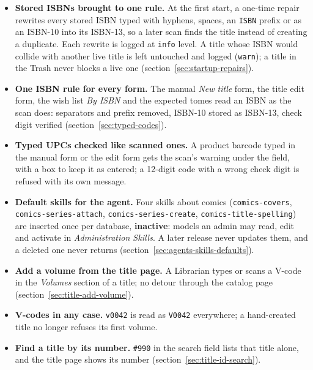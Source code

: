 \begin{itemize}
  \item \textbf{Stored ISBNs brought to one rule.} At the first start, a
        one-time repair rewrites every stored ISBN typed with hyphens,
        spaces, an \texttt{ISBN} prefix or as an ISBN-10 into its
        ISBN-13, so a later scan finds the title instead of creating a
        duplicate. Each rewrite is logged at \texttt{info} level. A
        title whose ISBN would collide with another live title is left
        untouched and logged (\texttt{warn}); a title in the Trash never
        blocks a live one (section~\ref{sec:startup-repairs}).
  \item \textbf{One ISBN rule for every form.} The manual
        \emph{New title} form, the title edit form, the wish list
        \emph{By ISBN} and the expected tomes read an ISBN as the scan
        does: separators and prefix removed, ISBN-10 stored as ISBN-13,
        check digit verified (section~\ref{sec:typed-codes}).
  \item \textbf{Typed UPCs checked like scanned ones.} A product barcode
        typed in the manual form or the edit form gets the scan's
        warning under the field, with a box to keep it as entered; a
        12-digit code with a wrong check digit is refused with its own
        message.
  \item \textbf{Default skills for the agent.} Four skills about comics
        (\texttt{comics-covers}, \texttt{comics-series-attach},
        \texttt{comics-series-create}, \texttt{comics-title-spelling})
        are inserted once per database, \textbf{inactive}: models an
        admin may read, edit and activate in \emph{Administration
        \textrightarrow{} Skills}. A later release never updates them,
        and a deleted one never returns
        (section~\ref{sec:agents-skills-defaults}).
  \item \textbf{Add a volume from the title page.} A Librarian types or
        scans a V-code in the \emph{Volumes} section of a title; no
        detour through the catalog page
        (section~\ref{sec:title-add-volume}).
  \item \textbf{V-codes in any case.} \texttt{v0042} is read as
        \texttt{V0042} everywhere; a hand-created title no longer
        refuses its first volume.
  \item \textbf{Find a title by its number.} \texttt{\#990} in the
        search field lists that title alone, and the title page shows
        its number (section~\ref{sec:title-id-search}).
\end{itemize}

